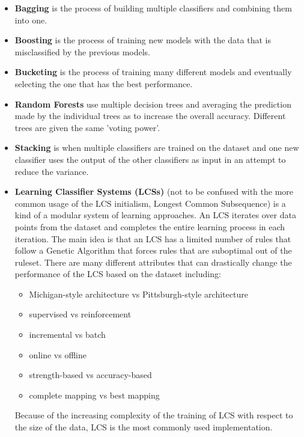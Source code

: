 \begin{itemize}
	\item \textbf{Bagging}
		is the process of building multiple classifiers and combining them into one.
	\item \textbf{Boosting}
		is the process of training new models with the data that is misclassified by the previous models.
	\item \textbf{Bucketing}
		is the process of training many different models and eventually selecting the one that has the best performance.
	\item \textbf{Random Forests}\cite{Breiman2001}
		use multiple decision trees and averaging the prediction made by the individual trees as to increase the overall accuracy. Different trees are given the same 'voting power'.
	\item \textbf{Stacking}
		is when multiple classifiers are trained on the dataset and one new classifier uses the output of the other classifiers as input in an attempt to reduce the variance.
	\item \textbf{Learning Classifier Systems (LCSs)}
		(not to be confused with the more common usage of the LCS initialism, Longest Common Subsequence) is a kind of a modular system of learning approaches. An LCS iterates over data points from the dataset and completes the entire learning process in each iteration. The main idea is that an LCS has a limited number of rules that follow a Genetic Algorithm that forces rules that are suboptimal out of the ruleset. There are many different attributes that can drastically change the performance of the LCS based on the dataset including:
		\begin{itemize}
			\item Michigan-style architecture vs Pittsburgh-style architecture
			\item supervised vs reinforcement
			\item incremental vs batch
			\item online vs offline
			\item strength-based vs accuracy-based
			\item complete mapping vs best mapping
		\end{itemize}
		Because of the increasing complexity of the training of LCS with respect to the size of the data, LCS is the most commonly used implementation.
\end{itemize}


%
%


